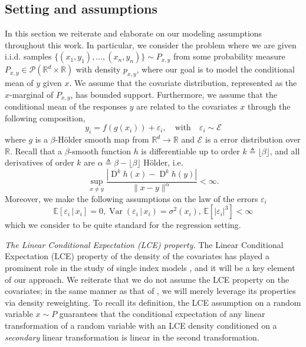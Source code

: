 \documentclass[11pt]{article}
\begin{document}
\subsection{Setting and assumptions}


In this section we reiterate and elaborate on our modeling assumptions throughout this work. In particular, we consider the problem where we are given i.i.d. samples $\{(x_1, y_1), \dots, (x_n, y_n)\} \sim P_{x,y}$ from some probability measure $P_{x,y} \in \mathcal{P}(\mathbb{R}^d\times \mathbb{R})$ with density $p_{x,y}$, where our goal is to model the conditional mean of $y$ given $x$. We assume that the covariate distribution, represented as the $x$-marginal of $P_{x,y}$, has bounded support. Furthermore, we assume that the conditional mean of the responses $y$ are related to the covariates $x$ through the following composition,
\begin{equation}
    y_i = f(g(x_i)) + \varepsilon_i, \quad \text{with} \quad \varepsilon_i \sim \mathcal{E} \label{eq: the model}
\end{equation}
where $g$ is a $\beta$-H\"older smooth map from $\mathbb{R}^d \rightarrow \mathbb{R}$ and $\mathcal{E}$ is a error distribution over $\mathbb{ R}$. Recall that a $\beta$-smooth function $h$ is differentiable up to order $k \triangleq\lfloor{\beta}\rfloor$, and all derivatives of order $k$ are $\alpha \triangleq \beta - \lfloor \beta \rfloor$ H\"older, i.e.
\[\sup_{x \neq y}\frac{|\operatorname{D}^{k}h(x) - \operatorname{D}^k h(y)|}{\|x - y\|^\alpha} < \infty.\]
Moreover, we make the following assumptions on the law of the errors $\varepsilon_i$
\[\mathbb{E}[\varepsilon_i \, | \, x_i] = 0, \operatorname{Var}(\varepsilon_i \,| \, x_i) = \sigma^2(x_i),\, \mathbb{E}[|\varepsilon_i|^3] < \infty\]
which we consider to be quite standard for the regression setting.
\medskip 


\emph{The Linear Conditional Expectation (LCE) property.}
The Linear Conditional Expectation (LCE) property of the density of the covariates has played a prominent role in the study of single index models \citep{li1989regression, li1991sliced}, and it will be a key element of our approach. We reiterate that we do not assume the LCE property on the covariates; in the same manner as that of \citet{Newey_Ruud_2005}, we will merely leverage its properties via density reweighting. To recall its definition, the LCE assumption on a random variable $x \sim P$ guarantees that the conditional expectation of any linear transformation of a random variable with an LCE density conditioned on a \textit{secondary} linear transformation is linear in the second transformation. 
\end{document}
